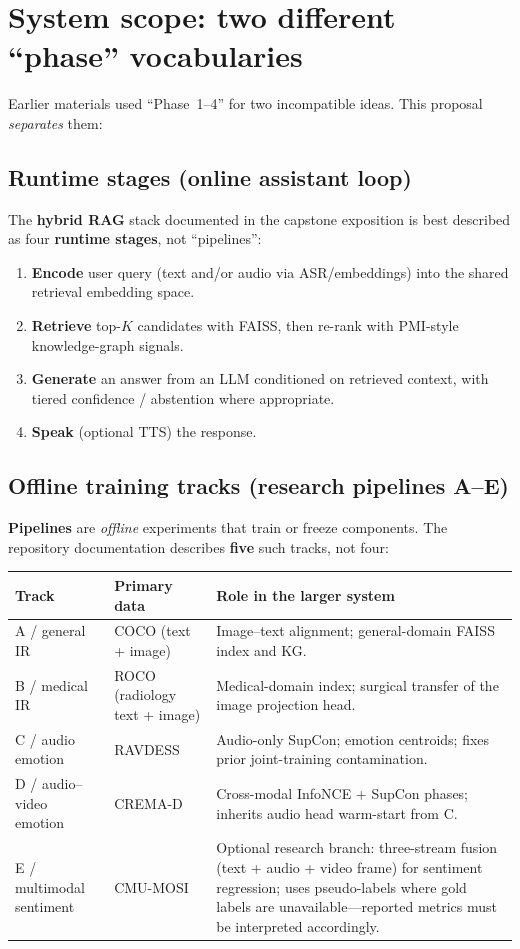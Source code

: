 \documentclass[12pt,a4paper]{article}
\begin{document}
\section{System scope: two different ``phase'' vocabularies}

Earlier materials used ``Phase~1--4'' for two incompatible ideas. This proposal
\emph{separates} them:

\subsection*{Runtime stages (online assistant loop)}
The \textbf{hybrid RAG} stack documented in the capstone exposition is best described
as four \textbf{runtime stages}, not ``pipelines'':
\begin{enumerate}[label=(\arabic*)]
  \item \textbf{Encode} user query (text and/or audio via ASR/embeddings) into the
        shared retrieval embedding space.
  \item \textbf{Retrieve} top-$K$ candidates with FAISS, then re-rank with PMI-style
        knowledge-graph signals.
  \item \textbf{Generate} an answer from an LLM conditioned on retrieved context,
        with tiered confidence / abstention where appropriate.
  \item \textbf{Speak} (optional TTS) the response.
\end{enumerate}

\subsection*{Offline training tracks (research pipelines A--E)}
\textbf{Pipelines} are \emph{offline} experiments that train or freeze components.
The repository documentation describes \textbf{five} such tracks, not four:
\begin{center}
\small
\begin{tabular}{@{}llp{6.8cm}@{}}
\toprule
\textbf{Track} & \textbf{Primary data} & \textbf{Role in the larger system} \\
\midrule
A / general IR & COCO (text + image) &
  Image--text alignment; general-domain FAISS index and KG. \\
B / medical IR & ROCO (radiology text + image) &
  Medical-domain index; surgical transfer of the image projection head. \\
C / audio emotion & RAVDESS &
  Audio-only SupCon; emotion centroids; fixes prior joint-training contamination. \\
D / audio--video emotion & CREMA-D &
  Cross-modal InfoNCE + SupCon phases; inherits audio head warm-start from C. \\
E / multimodal sentiment & CMU-MOSI &
  Optional research branch: three-stream fusion (text + audio + video frame) for
  sentiment regression; uses pseudo-labels where gold labels are unavailable---reported
  metrics must be interpreted accordingly. \\
\bottomrule
\end{tabular}
\end{center}
\end{document}
